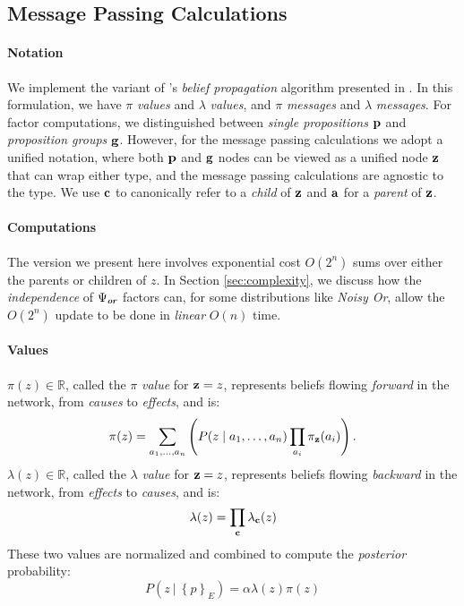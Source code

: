 \documentclass[11pt]{article}
\newcommand{\zvariable}{{\bf z}}
\newcommand{\cvariable}{{\bf c}}
\newcommand{\avariable}{{\bf a}}
\newcommand{\pvariable}{{\bf p}}
\newcommand{\gvariable}{{\bf g}}
\newcommand{\condsep}{\ |\ }
\newcommand{\opor}{\textbf{\em or}}
\begin{document}
\subsection{Message Passing Calculations}
\paragraph{Notation}
We implement the variant of \cite{pearl1988probabilistic}'s {\em belief propagation} algorithm presented in \cite{neapolitan2003learning}.
In this formulation, we have $\pi$ {\em values} and $\lambda$ {\em values}, and $\pi$ {\em messages} and $\lambda$ {\em messages}.
For factor computations, we distinguished between {\em single propositions} $\pvariable$ and {\em proposition groups} $\gvariable$.
However, for the message passing calculations we adopt a unified notation, where both $\pvariable$ and $\gvariable$ nodes can be viewed as a unified node $\zvariable$ that can wrap either type, and the message passing calculations are agnostic to the type.
We use $\cvariable$ to canonically refer to a {\em child} of $\zvariable$ and $\avariable$ for a {\em parent} of $\zvariable$.
\paragraph{Computations}
The version we present here involves exponential cost $O(2^n)$ sums over either the parents or children of $z$.
In Section \ref{sec:complexity}, we discuss how the {\em independence} of $\Psi_\opor$ factors can, for some distributions like {\em Noisy Or}, allow the $O(2^n)$ update to be done in {\em linear} $O(n)$ time. 
\paragraph{Values}
$\pi(z)\in \mathbb{R}$, called the $\pi$ {\em value} for $\zvariable = z$, represents beliefs flowing {\em forward} in the network, from {\em causes} to {\em effects}, and is:
\begin{equation}
    \pi(z) = \sum_{a_1, \ldots, a_n} \left( P(z \mid a_1, \ldots, a_n) \prod_{a_i} \pi_\zvariable(a_i) \right).
    \label{eq:slow_pi_calc}
\end{equation}
$\lambda(z)\in \mathbb{R}$, called the $\lambda$ {\em value} for $\zvariable = z$, represents beliefs flowing {\em backward} in the network, from {\em effects} to {\em causes}, and is:
\begin{equation}
    \lambda(z) = \prod_{\cvariable} \lambda_{\cvariable}(z)
\end{equation}
These two values are normalized and combined to compute the {\em posterior} probability:
\begin{equation}P(z \condsep \left\{p\right\}_E) = \alpha\lambda(z)\pi(z) \end{equation}
\end{document}
